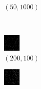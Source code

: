 \documentclass[a4paper, landscape]{article}
\begin{document}
\begin{figure}[H]
\begin{subfigure}{0.07\linewidth}
        \caption*{$(50, 1000)$}
    \end{subfigure}
    \\
    \begin{subfigure}{0.07\linewidth}
        \centering
        \includegraphics[width=\linewidth]{iht/k = 200, m = 100.png}
        \caption*{$(200, 100)$}
    \end{subfigure}
    \begin{subfigure}{0.07\linewidth}
        \centering
        \includegraphics[width=\linewidth]{iht/k = 200, m = 200.png}

\end{subfigure}
\end{figure}
\end{document}
